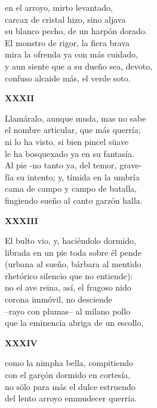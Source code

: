 \documentclass[11pt,twoside]{article}
\newcommand{\guno}{\textbf{\emph{G}\textsuperscript{1}}}
\begin{document}
en el arroyo, mirto levantado,\\
carcax de cristal hizo, sino aljava\\
su blanco pecho, de un harpón dorado.\\
El monstro de rigor, la fiera brava\\
mira la ofrenda ya con más cuidado,\\
y aun siente que a su dueño sea, devoto,\\
confuso alcaide más, el verde soto.\par\poend
%
\begin{center}
	\textbf{XXXII}
\end{center}\postart
Llamáralo, aunque muda, mas no sabe\\
el nombre articular, que más querría;\\
ni lo ha visto, si bien pincel süave\\
le ha bosquexado ya en su fantasía.\\
Al pie -no tanto ya, del temor, grave-\\
fía su intento; y, tímida en la umbría\\
cama de campo y campo de batalla,\\
fingiendo sueño al canto garzón halla.\par\poend
\repage
%
\begin{center}
	\textbf{XXXIII}
\end{center}\postart
El bulto vio, y, haciéndolo dormido,\\
librada en un pie toda sobre él pende\\
(urbana al sueño, bárbara al mentido\\
rhetórico silencio que no entiende):\\
no el ave reina, así, el fragoso nido\\
corona immóvil, \footA{mientras}{quando no {\guno}} no desciende\\
--rayo con plumas-- al milano pollo\\
que la eminencia abriga de un escollo,\par\poend
%
\begin{center}
	\textbf{XXXIV}
\end{center}\postart
como la nimpha bella, compitiendo\\
con el garçón dormido en cortesía,\\
no sólo para más el dulce estruendo\\
del lento arroyo emmudecer querría.\\
\end{document}
